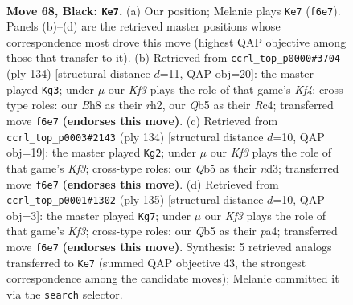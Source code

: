 \documentclass[11pt]{article}
\begin{document}
\clearpage

\begin{figure}[p]\centering
\begin{subfigure}{0.46\textwidth}\centering
\resizebox{\linewidth}{!}{%
\newchessgame
\chessboard[
  setfen={7b/3P1p2/5k2/1q6/8/7K/8/8 b - - 0 68},
  showmover=false,
  pgfstyle=straightmove, color=movearrow, markmove={f6-e7}
]}
\caption{}
\end{subfigure}\hfill
\begin{subfigure}{0.46\textwidth}\centering
\resizebox{\linewidth}{!}{%
\newchessgame
\chessboard[
  setfen={8/8/2p3k1/8/2R2K2/5P2/7r/8 w - - 0 68},
  showmover=false,
  pgfstyle=straightmove, color=movearrow, markmove={f4-g3}
]}
\caption{}
\end{subfigure}
\\[4pt]
\begin{subfigure}{0.46\textwidth}\centering
\resizebox{\linewidth}{!}{%
\newchessgame
\chessboard[
  setfen={B7/8/8/8/7k/3n1K2/5P1p/8 w - - 0 68},
  showmover=false,
  pgfstyle=straightmove, color=movearrow, markmove={f3-g2}
]}
\caption{}
\end{subfigure}\hfill
\begin{subfigure}{0.46\textwidth}\centering
\resizebox{\linewidth}{!}{%
\newchessgame
\chessboard[
  setfen={3b4/5p2/5k2/7P/P7/8/4K1B1/8 b - - 2 68},
  showmover=false,
  pgfstyle=straightmove, color=movearrow, markmove={f6-g7}
]}
\caption{}
\end{subfigure}
\caption{\textbf{Move 68, Black: \texttt{Ke7}.} (a) Our position; Melanie plays \texttt{Ke7} (\texttt{f6e7}). Panels (b)--(d) are the retrieved master positions whose correspondence most drove this move (highest QAP objective among those that transfer to it). (b) Retrieved from \texttt{ccrl\_top\_p0000\#3704} (ply 134) [structural distance $d$=11, QAP obj=20]: the master played \texttt{Kg3}; under $\mu$ our \emph{Kf3} plays the role of that game's \emph{Kf4}; cross-type roles: our \emph{B}h8 as their \emph{r}h2, our \emph{Q}b5 as their \emph{R}c4; transferred move \texttt{f6e7} \textbf{(endorses this move)}. (c) Retrieved from \texttt{ccrl\_top\_p0003\#2143} (ply 134) [structural distance $d$=10, QAP obj=19]: the master played \texttt{Kg2}; under $\mu$ our \emph{Kf3} plays the role of that game's \emph{Kf3}; cross-type roles: our \emph{Q}b5 as their \emph{n}d3; transferred move \texttt{f6e7} \textbf{(endorses this move)}. (d) Retrieved from \texttt{ccrl\_top\_p0001\#1302} (ply 135) [structural distance $d$=10, QAP obj=3]: the master played \texttt{Kg7}; under $\mu$ our \emph{Kf3} plays the role of that game's \emph{Kf3}; cross-type roles: our \emph{Q}b5 as their \emph{p}a4; transferred move \texttt{f6e7} \textbf{(endorses this move)}. Synthesis: 5 retrieved analogs transferred to \texttt{Ke7} (summed QAP objective 43, the strongest correspondence among the candidate moves); Melanie committed it via the \texttt{search} selector.}
\label{fig:thought-m135}
\end{figure}
\end{document}
